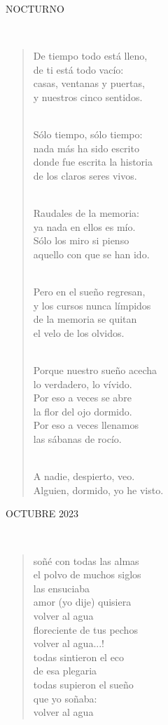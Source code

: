 \documentclass[a4paper, 12pt]{article}
\begin{document}
\pagebreak
\centerline{NOCTURNO}
~ 

\begin{verse}
De tiempo todo está lleno,\\
de ti está todo vacío:\\
casas, ventanas y puertas,\\
y nuestros cinco sentidos.\\
~ 

Sólo tiempo, sólo tiempo:\\
nada más ha sido escrito\\
donde fue escrita la historia\\
de los claros seres vivos.\\
~ 

Raudales de la memoria:\\
ya nada en ellos es mío.\\
Sólo los miro si pienso\\
aquello con que se han ido.\\
~ 

Pero en el sueño regresan,\\
y los cursos nunca límpidos\\
de la memoria se quitan\\
el velo de los olvidos.\\
~ 

Porque nuestro sueño acecha\\
lo verdadero, lo vívido.\\
Por eso a veces se abre\\
la flor del ojo dormido.\\
Por eso a veces llenamos\\
las sábanas de rocío.\\
~ 

A nadie, despierto, veo.\\
Alguien, dormido, yo he visto.\\
\end{verse}

\pagebreak
\centerline{OCTUBRE 2023}
~ 

\begin{verse}
soñé con todas las almas\\

el polvo de muchos siglos\\
las ensuciaba\\

amor (yo dije) quisiera\\
volver al agua\\
floreciente de tus pechos\\
volver al agua...!\\

todas sintieron el eco\\
de esa plegaria\\

todas supieron el sueño\\
que yo soñaba:\\

volver al agua\\
\end{verse}
\end{document}
